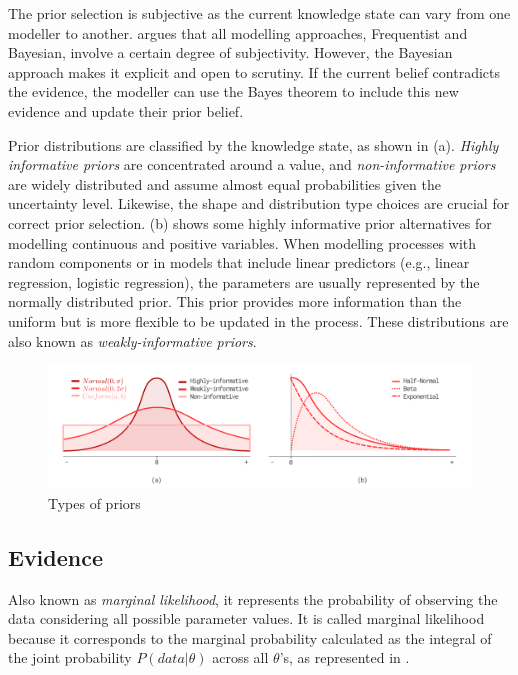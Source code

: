 The prior selection is subjective as the current knowledge state can vary from one modeller to another. \citet{McElreath2016} argues that all modelling approaches, Frequentist and Bayesian, involve a certain degree of subjectivity. However, the Bayesian approach makes it explicit and open to scrutiny. If the current belief contradicts the evidence, the modeller can use the Bayes theorem to include this new evidence and update their prior belief. 

Prior distributions are classified by the knowledge state, as shown in (a). \textit{Highly informative priors} are concentrated around a value, and \textit{non-informative priors} are widely distributed and assume almost equal probabilities given the uncertainty level. Likewise, the shape and distribution type choices are crucial for correct prior selection. (b) shows some highly informative prior alternatives for modelling continuous and positive variables. When modelling processes with random components or in models that include linear predictors (e.g., linear regression, logistic regression), the parameters are usually represented by the normally distributed prior. This prior provides more information than the uniform but is more flexible to be updated in the process. These distributions are also known as \textit{weakly-informative priors}. 

\begin{figure}[h]
    \centering
    \includegraphics[width=1.0\textwidth]{images/ch3_informative_priors/informative_priors.png}
    \caption{Types of priors}
    \label{fig:priors}
\end{figure}

\subsection{Evidence} 

Also known as \textit{marginal likelihood}, it represents the probability of observing the data considering all possible parameter values. It is called marginal likelihood because it corresponds to the marginal probability calculated as the integral of the joint probability $P(data|\theta)$ across all $\theta$'s, as represented in \citep{Lambert2018}. 

